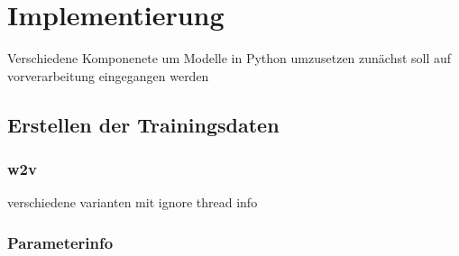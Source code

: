 \chapter{Implementierung}\label{ch:implementierung}
Verschiedene Komponenete um Modelle in Python umzusetzen 
zunächst soll auf vorverarbeitung eingegangen werden

\section{Erstellen der Trainingsdaten}
\subsection{w2v}
verschiedene varianten mit ignore thread info
\subsection{Parameterinfo}
